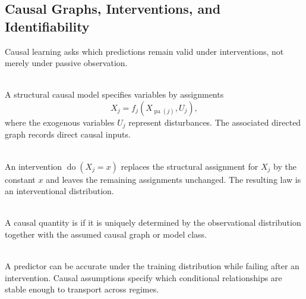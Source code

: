 \subsection{Causal Graphs, Interventions, and Identifiability}

Causal learning asks which predictions remain valid under interventions, not merely under passive observation.

\begin{definition} \label{def:sl-structural-causal-model} \\
A structural causal model specifies variables by assignments
\[
X_j=f_j(X_{\operatorname{pa}(j)},U_j),
\]
where the exogenous variables $U_j$ represent disturbances.  The associated directed graph records direct causal inputs.
\end{definition}

\begin{definition} \label{def:sl-intervention-do-operator} \\
An intervention $\operatorname{do}(X_j=x)$ replaces the structural assignment for $X_j$ by the constant $x$ and leaves the remaining assignments unchanged.  The resulting law is an interventional distribution.
\end{definition}

\begin{definition} \label{def:sl-causal-identifiability} \\
A causal quantity is  if it is uniquely determined by the observational distribution together with the assumed causal graph or model class.
\end{definition}

\begin{remark} \label{rem:sl-causal-versus-predictive} \\
A predictor can be accurate under the training distribution while failing after an intervention.  Causal assumptions specify which conditional relationships are stable enough to transport across regimes.
\end{remark}
